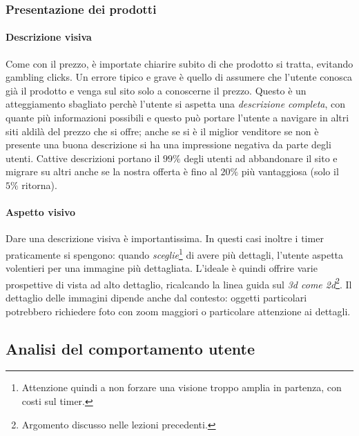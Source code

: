 \subsubsection{Presentazione dei prodotti}

\paragraph*{Descrizione visiva}Come con il prezzo, \`e importate chiarire subito di che prodotto si tratta, evitando gambling clicks. Un errore tipico e grave \`e quello di assumere che l'utente conosca gi\`a il prodotto e venga sul sito solo a conoscerne il prezzo. Questo \`e un atteggiamento sbagliato perch\`e l'utente si aspetta una \textit{descrizione completa}, con quante pi\`u informazioni possibili e questo pu\`o portare l'utente a navigare in altri siti aldil\`a del prezzo che si offre; anche se si \`e il miglior venditore se non \`e presente una buona descrizione si ha una impressione negativa da parte degli utenti. Cattive descrizioni portano il $99\%$ degli utenti ad abbandonare il sito e migrare su altri anche se la nostra offerta \`e fino al $20\%$ pi\`u vantaggiosa (solo il $5\%$ ritorna).

\paragraph*{Aspetto visivo}Dare una descrizione visiva \`e importantissima. In questi casi inoltre i timer praticamente si spengono: quando \textit{sceglie}\footnote{Attenzione quindi a non forzare una visione troppo amplia in partenza, con costi sul timer.} di avere pi\`u dettagli, l'utente aspetta volentieri per una immagine pi\`u dettagliata. L'ideale \`e quindi offrire varie prospettive di vista ad alto dettaglio, ricalcando la linea guida sul \textit{3d come 2d}\footnote{Argomento discusso nelle lezioni precedenti.}. Il dettaglio delle immagini dipende anche dal contesto: oggetti particolari potrebbero richiedere foto con zoom maggiori o particolare attenzione ai dettagli.

\subsection{Analisi del comportamento utente}

